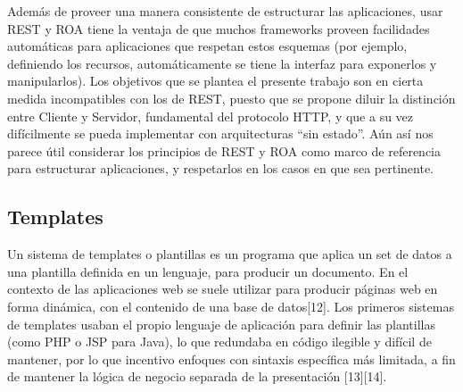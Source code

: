\documentclass[doc,helv,longtable]{article}
\begin{document}
Además de proveer una manera consistente de estructurar las aplicaciones, usar REST y ROA tiene la ventaja de que muchos frameworks proveen facilidades automáticas para aplicaciones que respetan estos esquemas (por ejemplo, definiendo los recursos, automáticamente se tiene la interfaz para exponerlos y manipularlos). Los objetivos que se plantea el presente trabajo son en cierta medida incompatibles con los de REST, puesto que se propone diluir la distinción entre Cliente y Servidor, fundamental del protocolo HTTP, y que a su vez difícilmente se pueda implementar con arquitecturas “sin estado”. Aún así nos parece útil considerar los principios de REST y ROA como marco de referencia para estructurar aplicaciones, y respetarlos en los casos en que sea pertinente.\subsection{Templates}


Un sistema de templates o plantillas es un programa que aplica un set de datos a una plantilla definida en un lenguaje, para producir un documento. En el contexto de las aplicaciones web se suele utilizar para producir páginas web en forma dinámica, con el contenido de una base de datos[12]. Los primeros sistemas de templates usaban el propio lenguaje de aplicación para definir las plantillas (como PHP o JSP para Java), lo que redundaba en código ilegible y difícil de mantener, por lo que incentivo enfoques con sintaxis específica más limitada, a fin de mantener la lógica de negocio separada de la presentación [13][14].
\end{document}
